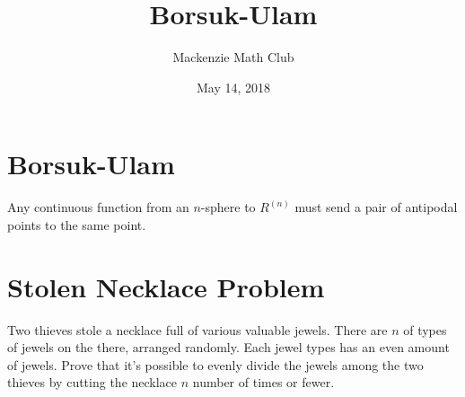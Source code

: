 \documentclass[letterpaper,12pt]{article}
\title{Borsuk-Ulam}
\author{Mackenzie Math Club}
\date{May 14, 2018}
\begin{document}
	\maketitle
	\section{Borsuk-Ulam}
		Any continuous function from an $n$-sphere to $R^(n)$ must send a pair of antipodal points to the same point.
	\section{Stolen Necklace Problem}
		Two thieves stole a necklace full of various valuable jewels. There are $n$ of types of jewels on the there, arranged randomly. Each jewel types has an even amount of jewels. Prove that it’s possible to evenly divide the jewels among the two thieves by cutting the necklace $n$ number of times or fewer.
\end{document}
